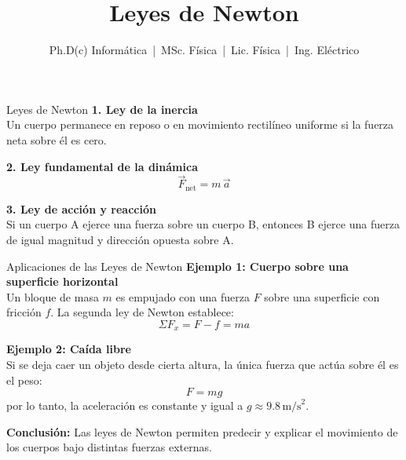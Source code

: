 \documentclass{beamer}
\title{Leyes de Newton}
\author{Ph.D(c) Informática \,|\, MSc. Física \,|\, Lic. Física \,|\, Ing. Eléctrico}
\date{}
\begin{document}
\begin{frame}{Leyes de Newton}
\textbf{1. Ley de la inercia} \\
Un cuerpo permanece en reposo o en movimiento rectilíneo uniforme si la fuerza neta sobre él es cero.

\vspace{0.4cm}
\textbf{2. Ley fundamental de la dinámica} \\
\[
\vec{F}_{\text{net}} = m \, \vec{a}
\]

\vspace{0.4cm}
\textbf{3. Ley de acción y reacción} \\
Si un cuerpo A ejerce una fuerza sobre un cuerpo B, entonces B ejerce una fuerza de igual magnitud y dirección opuesta sobre A.
\end{frame}

\begin{frame}{Aplicaciones de las Leyes de Newton}
	\textbf{Ejemplo 1: Cuerpo sobre una superficie horizontal} \\[4pt]
	Un bloque de masa \( m \) es empujado con una fuerza \( F \) sobre una superficie con fricción \( f \).  
	La segunda ley de Newton establece:
	\[
	\Sigma F_x = F - f = m a
	\]
	
	\vspace{0.4cm}
	\textbf{Ejemplo 2: Caída libre} \\[4pt]
	Si se deja caer un objeto desde cierta altura, la única fuerza que actúa sobre él es el peso:
	\[
	F = m g
	\]
	por lo tanto, la aceleración es constante y igual a \( g \approx 9.8\,\text{m/s}^2 \).
	
	\vspace{0.4cm}
	\textbf{Conclusión:} Las leyes de Newton permiten predecir y explicar el movimiento de los cuerpos bajo distintas fuerzas externas.
\end{frame}
\end{document}
